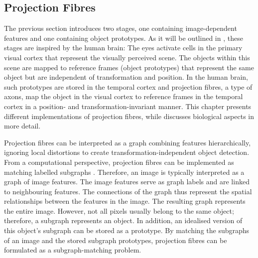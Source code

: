 \subsection{Projection Fibres}
The previous section introduces two stages, one containing image-dependent features and one containing object prototypes.
As it will be outlined in , these stages are inspired by the human brain: The eyes activate cells in the primary visual cortex  that represent the visually perceived scene.
The objects within this scene are mapped to reference frames (object prototypes) that represent the same object but are independent of transformation and position.
In the human brain, such prototypes are stored in the temporal cortex  and projection fibres, a type of axons, map the object in the visual cortex to reference frames in the temporal cortex in a position- and transformation-invariant manner.
This chapter presents different implementations of projection fibres, while  discusses biological aspects in more detail. 

Projection fibres can be interpreted as a graph combining features hierarchically, ignoring local distortions to create transformation-independent object detection.
From a computational perspective, projection fibres can be implemented as matching labelled subgraphs \cite{bienenstock_neural_1987, lades_distortion_1993, wiskott_face_1996}.
Therefore, an image is typically interpreted as a graph of image features. The image features serve as graph labels and are linked to neighbouring features. The connections of the graph thus represent the spatial relationships between the features in the image.
The resulting graph represents the entire image. However, not all pixels usually belong to the same object; therefore, a subgraph represents an object.
In addition, an idealised version of this object's subgraph can be stored as a prototype.
By matching the subgraphs of an image and the stored subgraph prototypes, projection fibres can be formulated as a subgraph-matching problem.

